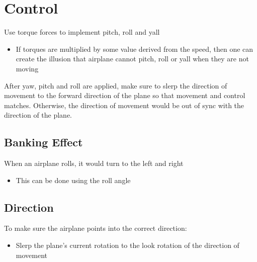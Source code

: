 \section{Control}

Use torque forces to implement pitch, roll and yall

\begin{itemize}
  \item If torques are multiplied by some value derived from the speed, then
  one can create the illusion that airplane cannot pitch, roll or yall
  when they are not moving
\end{itemize}

After yaw, pitch and roll are applied, make sure to slerp the direction of
movement to the forward direction of the plane so that movement and
control matches. Otherwise, the direction of movement would be out of sync
with the direction of the plane.

\subsection{Banking Effect}

  When an airplane rolls, it would turn to the left and right

  \begin{itemize}
    \item This can be done using the roll angle
  \end{itemize}

\subsection{Direction}

  To make sure the airplane points into the correct direction:

  \begin{itemize}
    \item Slerp the plane's current rotation to the look rotation of
    the direction of movement
  \end{itemize}
